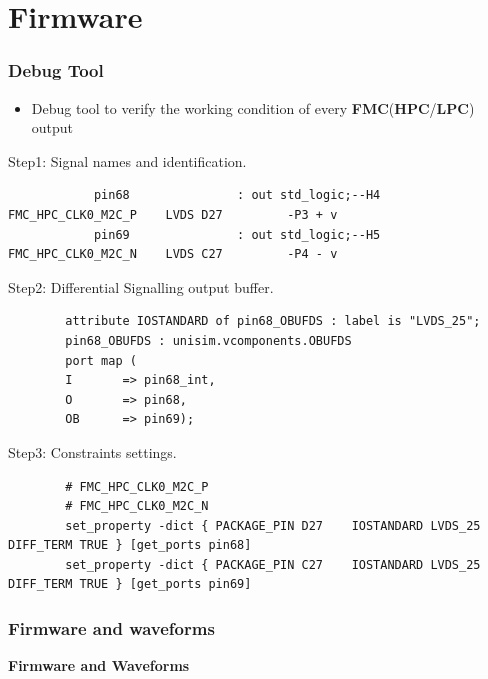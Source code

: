 \documentclass[aspectratio=169]{beamer}
\begin{document}
	
	\section{Firmware}
	
	
	
	\begin{frame}[fragile]
	\frametitle{Debug Tool}
	\begin{itemize}
		\item Debug tool to verify the working condition of every \textbf{FMC}(\textbf{HPC}/\textbf{LPC}) output
	\end{itemize}
	\begin{center}
		{\small \color{blue} Step1: Signal names and identification.}
	\end{center}
	{\tiny
		\begin{verbatim}
			pin68				: out std_logic;--H4  FMC_HPC_CLK0_M2C_P    LVDS D27         -P3 + v
			pin69				: out std_logic;--H5  FMC_HPC_CLK0_M2C_N    LVDS C27         -P4 - v 
		\end{verbatim} }
	\begin{center}
		{\small \color{blue} Step2: Differential Signalling output buffer.}
	\end{center}
	{\tiny
		\begin{verbatim}
		attribute IOSTANDARD of pin68_OBUFDS : label is "LVDS_25";	
		pin68_OBUFDS : unisim.vcomponents.OBUFDS
		port map (
		I		=> pin68_int,
		O		=> pin68,
		OB		=> pin69);		
		\end{verbatim} }
	\begin{center}
		{\small \color{blue} Step3: Constraints settings.}
	\end{center}
	{\tiny
		\begin{verbatim}
		# FMC_HPC_CLK0_M2C_P
		# FMC_HPC_CLK0_M2C_N
		set_property -dict { PACKAGE_PIN D27	IOSTANDARD LVDS_25 DIFF_TERM TRUE }	[get_ports pin68]
		set_property -dict { PACKAGE_PIN C27	IOSTANDARD LVDS_25 DIFF_TERM TRUE }	[get_ports pin69]
		\end{verbatim} }
	\end{frame}

	\begin{frame}
	\frametitle{Firmware and waveforms}
	\begin{center}
		{\Huge {}\selectfont \color{blue} \textbf{Firmware and Waveforms}}
	\end{center}
	\end{frame}
\end{document}
